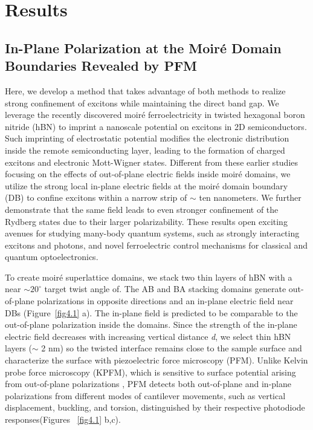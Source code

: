 \section{Results}
\subsection{In-Plane Polarization at the Moiré Domain Boundaries Revealed by PFM}

Here, we develop a method that takes advantage of both methods to realize strong confinement of excitons while maintaining the direct band gap. 
We leverage the recently discovered moiré ferroelectricity\cite{Woods2021-cn,Yasuda2021-is,Wang2022-hi,Kim2024-al} in twisted hexagonal boron nitride (hBN) to imprint a nanoscale potential on excitons in 2D semiconductors\cite{Gu2024-gk,Zhao2021-cm,Kim2025-jv}. 
Such imprinting of electrostatic potential modifies the electronic distribution inside the remote semiconducting layer, leading to the formation of charged excitons\cite{Cho2025-ai} and electronic Mott-Wigner states\cite{Kiper2025-ao}. 
Different from these earlier studies focusing on the effects of out-of-plane electric fields inside moiré domains\cite{Vizner-Stern2021-gx,Wu2021-cf}, we utilize the strong local in-plane electric fields at the moiré domain boundary (DB) to confine excitons within a narrow strip of $\sim$ ten nanometers. We further demonstrate that the same field leads to even stronger confinement of the Rydberg states due to their larger polarizability\cite{Heckotter2017-im}. 
These results open exciting avenues for studying many-body quantum systems, such as strongly interacting excitons and photons\cite{Froese2025-sz}, and novel ferroelectric control mechanisms for classical and quantum optoelectronics\cite{Zhang2024-mw,Sung2020-tn,Yang2024-er}. 

To create moiré superlattice domains, we stack two thin layers of hBN with a near $\sim 20^\circ$ target twist angle of\cite{Kim2024-al,Sung2020-tn}. The AB and BA stacking domains generate out-of-plane polarizations in opposite directions and an in-plane electric field near DBs (Figure~\ref{fig4.1} a). 
The in-plane field is predicted to be comparable to the out-of-plane polarization inside the domains\cite{Bennett2023-cs,Walet2021-zp}. 
Since the strength of the in-plane electric field decreases with increasing vertical distance \textit{d}\cite{Kim2024-al}, 
we select thin hBN layers ($\sim$ 2 nm) so the twisted interface remains close to the sample surface and characterize the surface with piezoelectric force microscopy (PFM). 
Unlike Kelvin probe force microscopy (KPFM), which is sensitive to surface potential arising from out-of-plane polarizations \cite{Woods2021-cn,Kim2024-al,Kim2025-jv,Vizner_Stern2021-ls,Han2024-bh,Weston2022-jl}, 
PFM detects both out-of-plane and in-plane polarizations from different modes of cantilever movements, such as vertical displacement, buckling, and torsion\cite{Li2024-un,Chiodini2025-qj}, distinguished by their respective photodiode responses\cite{McGilly2020-nz}(Figures ~\ref{fig4.1} b,c).

